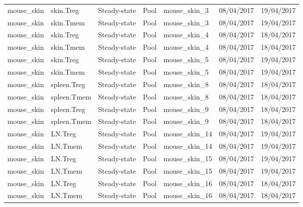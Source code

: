 \begin{table}[H]
\begin{tabular}{lllllll}
  mouse\_skin & skin.Treg & Steady-state & Pool & mouse\_skin\_3 & 08/04/2017 & 19/04/2017 \\ 
  mouse\_skin & skin.Tmem & Steady-state & Pool & mouse\_skin\_3 & 08/04/2017 & 19/04/2017 \\ 
  mouse\_skin & skin.Treg & Steady-state & Pool & mouse\_skin\_4 & 08/04/2017 & 18/04/2017 \\ 
  mouse\_skin & skin.Tmem & Steady-state & Pool & mouse\_skin\_4 & 08/04/2017 & 18/04/2017 \\ 
  mouse\_skin & skin.Treg & Steady-state & Pool & mouse\_skin\_5 & 08/04/2017 & 19/04/2017 \\ 
  mouse\_skin & skin.Tmem & Steady-state & Pool & mouse\_skin\_5 & 08/04/2017 & 19/04/2017 \\ 
  mouse\_skin & spleen.Treg & Steady-state & Pool & mouse\_skin\_8 & 08/04/2017 & 18/04/2017 \\ 
  mouse\_skin & spleen.Tmem & Steady-state & Pool & mouse\_skin\_8 & 08/04/2017 & 18/04/2017 \\ 
  mouse\_skin & spleen.Treg & Steady-state & Pool & mouse\_skin\_9 & 08/04/2017 & 18/04/2017 \\ 
  mouse\_skin & spleen.Tmem & Steady-state & Pool & mouse\_skin\_9 & 08/04/2017 & 18/04/2017 \\ 
  mouse\_skin & LN.Treg & Steady-state & Pool & mouse\_skin\_14 & 08/04/2017 & 19/04/2017 \\ 
  mouse\_skin & LN.Tmem & Steady-state & Pool & mouse\_skin\_14 & 08/04/2017 & 19/04/2017 \\ 
  mouse\_skin & LN.Treg & Steady-state & Pool & mouse\_skin\_15 & 08/04/2017 & 19/04/2017 \\ 
  mouse\_skin & LN.Tmem & Steady-state & Pool & mouse\_skin\_15 & 08/04/2017 & 19/04/2017 \\ 
  mouse\_skin & LN.Treg & Steady-state & Pool & mouse\_skin\_16 & 08/04/2017 & 18/04/2017 \\ 
  mouse\_skin & LN.Tmem & Steady-state & Pool & mouse\_skin\_16 & 08/04/2017 & 18/04/2017 \\ 
   \bottomrule
\end{tabular}
\end{table}

